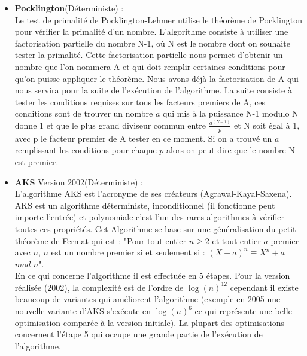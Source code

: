 \begin{itemize}
			\item \textbf{Pocklington}\cite{pocklington}(Déterministe) :\\
			 Le test de primalité de Pocklington-Lehmer utilise le théorème de Pocklington pour vérifier la primalité d’un nombre.
L’algorithme consiste à utiliser une factorisation partielle du nombre N-1, où N est le nombre dont on souhaite tester la primalité. Cette factorisation partielle nous permet d’obtenir un nombre que l’on nommera A et qui doit remplir certaines conditions pour qu’on puisse appliquer le théorème.
Nous avons déjà la factorisation de A qui nous servira pour la suite de l'exécution de l’algorithme. 
La suite consiste à tester les conditions requises sur tous les facteurs premiers de A, ces conditions sont de trouver un nombre $a$ qui mis à la puissance N-1 modulo N donne 1 et que le plus grand diviseur commun entre {\Large$\frac{a^{(N-1)}}{p}$} et N soit égal à 1, avec p le facteur premier de A tester en ce moment. Si on a trouvé un $a$ remplissant les conditions pour chaque $p$ alors on peut dire que le nombre N est premier.\\

			\item \textbf{AKS} Version 2002\cite{AKS1}\cite{agrawal2004primes}(Déterministe) :\\
			L'algorithme AKS est l’acronyme de ses créateurs (Agrawal-Kayal-Saxena). AKS est un algorithme déterministe, inconditionnel (il fonctionne peut importe l'entrée) et polynomiale c'est l'un des rares algorithmes à vérifier toutes ces propriétés. Cet Algorithme se base sur une généralisation du petit théorème de Fermat\cite{AKS1} qui est : "Pour tout entier $n \geq 2$ et tout entier $a$ premier avec $n$, $n$ est un nombre premier si et seulement si : $(X + a)^n \equiv X^n + a$ $mod$ $n$".\\

En ce qui concerne l’algorithme il est effectuée en 5 étapes\cite{AKS2}.
Pour la version réalisée (2002), la complexité est de l'ordre de $\log(n)^{12}$ cependant il existe beaucoup de variantes qui améliorent l'algorithme (exemple en 2005 une nouvelle variante d'AKS s’exécute en $\log(n)^6$ ce qui représente une belle optimisation comparée à la version initiale). La plupart des optimisations concernent l'étape 5 qui occupe une grande partie de l'exécution de l'algorithme.\\
			

\end{itemize}

